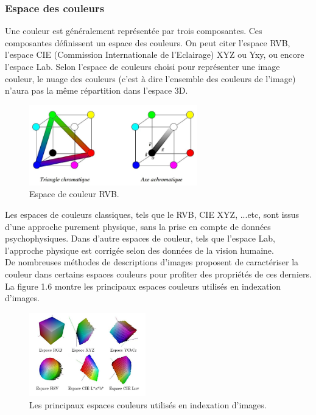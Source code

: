 \subsubsection{Espace des couleurs}
Une couleur est généralement représentée par trois composantes. Ces composantes définissent un espace des couleurs. On peut citer l'espace RVB, l'espace CIE (Commission Internationale de l'Eclairage) XYZ ou Yxy, ou encore l'espace Lab. Selon l'espace de couleurs choisi pour représenter une image couleur, le nuage des couleurs (c'est à dire l'ensemble des couleurs de l'image) n'aura pas la même répartition dans l'espace 3D.

\begin{figure}[H]
	\label{fig:espaceRVB}
	\centering
	\includegraphics[width=0.65\textwidth]{Figures/espaceRVB} %
	
	\caption{Espace de couleur RVB.}
	
\end{figure}

Les espaces de couleurs classiques, tels que le RVB, CIE XYZ, ...etc, sont issus d'une approche purement physique, sans la prise en compte de données psychophysiques. Dans d'autre espaces de couleur, tels que l'espace Lab, l'approche physique est corrigée selon des données de la vision humaine.\\

De nombreuses méthodes de descriptions d'images proposent de caractériser la couleur dans certains espaces couleurs pour profiter des propriétés de ces derniers. La figure 1.6
montre les principaux espaces couleurs utilisés en indexation d’images.

\begin{figure}[H]
	\label{fig:espaceCouleur}
	\centering
	\includegraphics[width=0.45\textwidth]{Figures/espaceCouleur} %
	\caption{Les principaux espaces couleurs utilisés en indexation d’images.}
	
\end{figure}


